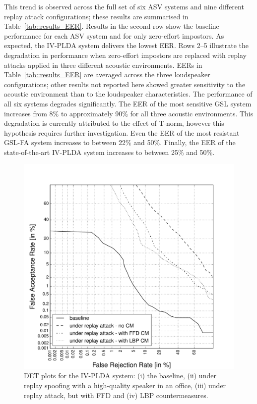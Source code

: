 This trend is observed across the full set of six ASV systems and nine different replay attack configurations;  
these results are summarised in Table~\ref{tab::results_EER}.
Results in the second row show the baseline performance for each ASV system and for only zero-effort impostors.
As expected, the IV-PLDA system delivers the lowest EER.
Rows 2--5 illustrate the degradation in performance when zero-effort impostors are replaced with replay attacks applied in three different acoustic environments.
EERs in Table~\ref{tab::results_EER} are averaged across the three loudspeaker configurations; other results not reported here showed greater sensitivity to the acoustic environment than to the loudspeaker characteristics.  
The performance of all six systems degrades significantly.
The EER of the most sensitive GSL system increases from 8\% to approximately 90\% for all three acoustic environments. This degradation is currently attributed to the effect of T-norm, however this hypothesis requires further investigation.
Even the EER of the most resistant GSL-FA system increases to between 22\% and 50\%.  
Finally, the EER of the state-of-the-art IV-PLDA system increases to between 25\% and 50\%.  %


\begin{figure}[!t]
	\centering
	\includegraphics[width=1\linewidth]{Figs/DET_IVPLDA_counter_Behr.pdf}
	\caption{DET plots for the IV-PLDA system: (i) the baseline, (ii) under replay spoofing with a high-quality speaker in an office, (iii) under replay attack, but with FFD and (iv) LBP countermeasures.}
	\label{fig::DETs_replay_IV}
\end{figure}

